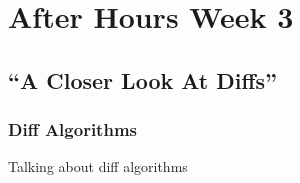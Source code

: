 \chapter{After Hours Week 3}
\section{``A Closer Look At Diffs''}
\subsection{Diff Algorithms}

Talking about diff algorithms
